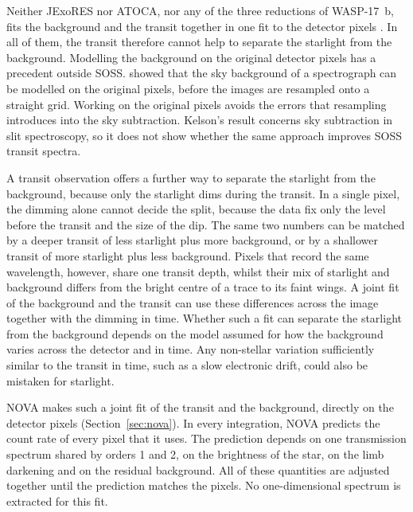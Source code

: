 Neither JExoRES nor ATOCA, nor any of the three reductions of WASP-17~b, fits
the background and the transit together in one fit to the detector pixels \citep{DarveauBernierEtAl2022,RadicaEtAl2023,HolmbergMadhusudhan2023,LouieEtAl2025}. In all of them, the transit therefore cannot help to separate the starlight from the background.
Modelling the background on the original detector pixels has a precedent
outside SOSS. \citet{Kelson2003} showed that the sky background of a
spectrograph can be modelled on the original pixels, before the images are
resampled onto a straight grid. Working on the original pixels avoids the
errors that resampling introduces into the sky subtraction. Kelson's result
concerns sky subtraction in slit spectroscopy, so it does not show whether
the same approach improves SOSS transit spectra.

A transit observation offers a further way to separate the starlight from the
background, because only the starlight dims during the transit. In a single
pixel, the dimming alone cannot decide the split, because the data fix only
the level before the transit and the size of the dip. The same two numbers
can be matched by a deeper transit of less starlight plus more background, or
by a shallower transit of more starlight plus less background. Pixels that
record the same wavelength, however, share one transit depth, whilst their
mix of starlight and background differs from the bright centre of a trace to
its faint wings. A joint fit of the background and the transit can use these
differences across the image together with the dimming in time. Whether such
a fit can separate the starlight from the background depends on the model
assumed for how the background varies across the detector and in time. Any
non-stellar variation sufficiently similar to the transit in time, such as a
slow electronic drift, could also be mistaken for starlight. 

NOVA makes such a joint fit of the transit and the background, directly on
the detector pixels (Section~\ref{sec:nova}). In every integration, NOVA
predicts the count rate of every pixel that it uses. The prediction depends
on one transmission spectrum shared by orders 1 and 2, on the brightness of
the star, on the limb darkening and on the residual background. All of these
quantities are adjusted together until the prediction matches the pixels. No
one-dimensional spectrum is extracted for this fit.

